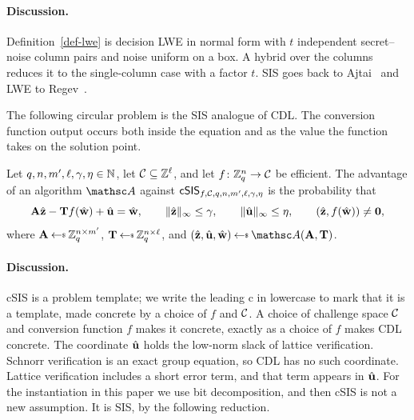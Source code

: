\paragraph*{Discussion.} Definition~\ref{def-lwe} is decision LWE in normal form with $t$ independent secret--noise column pairs and noise uniform on a box. A hybrid over the columns reduces it to the single-column case with a factor $t$. SIS goes back to Ajtai~\cite{STOC:Ajtai96} and LWE to Regev~\cite{STOC:Regev05}. 

The following circular problem is the SIS analogue of CDL. The conversion function output occurs both inside the equation and as the value the function takes on the solution point.

\begin{definition} \label{def-csis}
Let $q, n, m', \ell, \gamma, \eta \in \mathbb N$, let $\mathcal{C} \subseteq \mathbb Z^{\ell}$, and let $f \colon \mathbb{Z}_q^n \to \mathcal{C}$ be efficient. The advantage of an algorithm $\advA$ against $\mathsf{cSIS}_{f,\mathcal{C},q,n,m',\ell,\gamma,\eta}$ is the probability that
$$
\mathbf{A}\hat{\mathbf{z}} - \mathbf{T}f(\hat{\mathbf{w}}) + \hat{\mathbf{u}} = \hat{\mathbf{w}},
\qquad
\|\hat{\mathbf{z}}\|_\infty \le \gamma,
\qquad
\|\hat{\mathbf{u}}\|_\infty \le \eta,
\qquad
(\hat{\mathbf{z}}, f(\hat{\mathbf{w}})) \ne \mathbf{0},
$$
where $\mat{A} \getsr \Zq^{n \times m'}$, $\mat{T} \getsr \Zq^{n \times \ell}$, and $(\hat{\mat{z}}, \hat{\mat{u}}, \hat{\mat{w}}) \getsr \advA(\mat{A}, \mat{T})$.
\end{definition}

\paragraph*{Discussion.} cSIS is a problem template; we write the leading c in lowercase to mark that it is a template, made concrete by a choice of $f$ and $\mathcal{C}$. A choice of challenge space $\mathcal{C}$ and conversion function $f$ makes it concrete, exactly as a choice of $f$ makes CDL concrete. The coordinate $\hat{\mathbf{u}}$ holds the low-norm slack of lattice verification. Schnorr verification is an exact group equation, so CDL has no such coordinate. Lattice verification includes a short error term, and that term appears in $\hat{\mathbf{u}}$. For the instantiation in this paper we use bit decomposition, and then cSIS is not a new assumption. It is SIS, by the following reduction.


